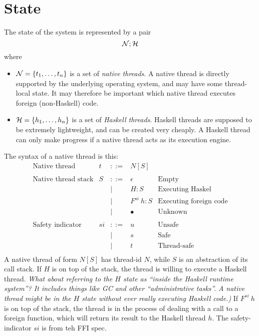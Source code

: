 \documentclass{article}
\newcommand{\NS}{{\cal N}}
\newcommand{\HS}{{\cal H}}
\newcommand{\hcall}{H}
\newcommand{\fcall}[2]{F^{#1}~#2}
\begin{document}
\section{State}

The state of the system is represented by a pair
$$\NS ; \HS$$
where 
\begin{itemize}
\item $\NS = \{t_1, \ldots ,t_n\}$ is a set of \emph{native threads}.
A native thread is directly supported by the underlying operating
system, and may have some thread-local state. It may therefore
be important which native thread executes foreign
(non-Haskell) code.

\item $\HS = \{h_1, \ldots ,h_n\}$ is a set of \emph{Haskell threads}.
Haskell threads are supposed to be extremely lightweight, and
can be created very cheaply. A Haskell thread can only make progress
if a native thread acts as its execution engine.
\end{itemize}

The syntax of a native thread is this:
$$
\begin{array}{lrcll}
\mbox{Native thread} &  t & ::= & N[S] \\
\\
\mbox{Native thread stack} &  S & ::= & \epsilon & \mbox{Empty}\\
	& & | & \hcall : S  & \mbox{Executing Haskel} \\
	& & | & \fcall{si}{h} : S & \mbox{Executing foreign code}\\
	& & | & \bullet & \mbox{Unknown}\\
\\
\mbox{Safety indicator} &  si & ::= & u & \mbox{Unsafe} \\
	& & | & s & \mbox{Safe} \\
	& & | & t & \mbox{Thread-safe} \\
\end{array}
$$
A native thread of form $N[S]$ has thread-id $N$, while $S$ is
an abstraction of its call stack.  If $\hcall$ is on top of the stack,
the thread is willing to execute a Haskell thread.
\emph{What about referring to the $\hcall$ state as
``inside the Haskell runtime system''? It includes things like GC and other
``administrative tasks''. A native thread might be in the $\hcall$ state 
without ever really executing Haskell code.)}
If $\fcall{si}{h}$ is
on top of the stack, the thread is in the process of dealing with a call
to a foreign function, which will return its result to the Haskell thread
$h$.  The safety-indicator $si$ is from teh FFI spec.
\end{document}
